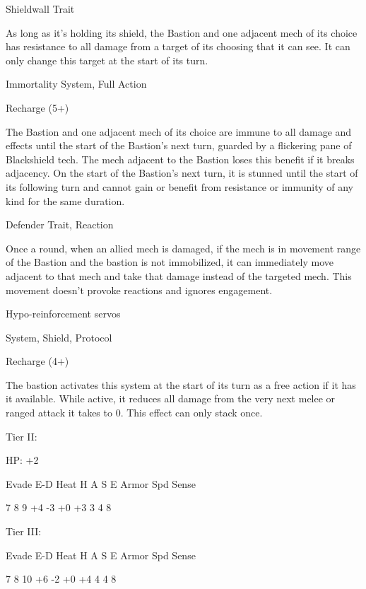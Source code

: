 Shieldwall
Trait

As long as it's holding its shield, the Bastion and one adjacent mech of its choice has resistance
to all damage from a target of its choosing that it can see. It can only change this target at the
start of its turn.


Immortality
System, Full Action

Recharge (5+)

The Bastion and one adjacent mech of its choice are immune to all damage and effects until the
start of the Bastion's next turn, guarded by a flickering pane of Blackshield tech. The mech
adjacent to the Bastion loses this benefit if it breaks adjacency. On the start of the Bastion's next
turn, it is stunned until the start of its following turn and cannot gain or benefit from resistance or
immunity of any kind for the same duration.


Defender
Trait, Reaction

Once a round, when an allied mech is damaged, if the mech is in movement range of the Bastion
and the bastion is not immobilized, it can immediately move adjacent to that mech and take that
damage instead of the targeted mech. This movement doesn't provoke reactions and ignores
engagement.


Hypo-reinforcement servos

System, Shield, Protocol

Recharge (4+)

The bastion activates this system at the start of its turn as a free action if it has it available. While
active, it reduces all damage from the very next melee or ranged attack it takes to 0. This effect
can only stack once.


Tier II:

HP: +2


          Evade     E-D    Heat    H     A     S     E       Armor        Spd      Sense

          7         8      9       +4    -3    +0   +3       3            4        8

Tier III:

          Evade     E-D    Heat    H     A     S     E       Armor        Spd      Sense

          7         8      10      +6    -2    +0   +4       4            4        8
